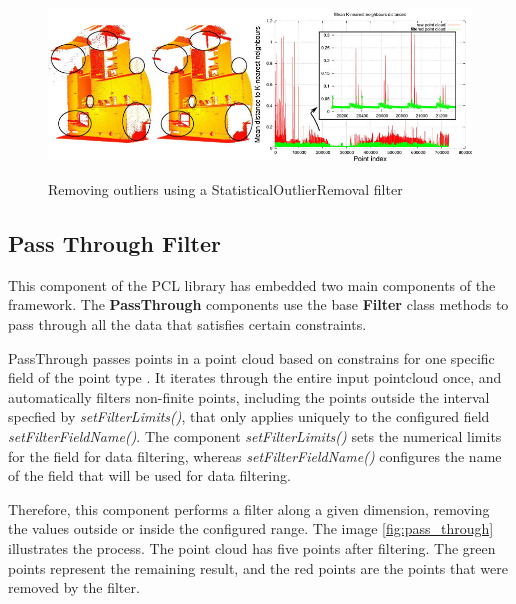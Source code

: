 \documentclass[12pt]{report}
\begin{document}
\begin{figure}[H]%
  \centering
  \includegraphics[width=1\textwidth]{statistical_removal_2.jpg}
 \caption{Removing outliers using a StatisticalOutlierRemoval filter}\cite[]{Rusu_ICRA2011_PCL}
 \label{fig:statistical_removal_2} 
\end{figure}




\subsection{Pass Through Filter}
\label{section:Pass Through Filter}
This component of the PCL library has embedded two main components of the framework. 
The \textbf{PassThrough} components use the base \textbf{Filter} class methods to pass through all the data that satisfies certain constraints.

PassThrough passes points in a point cloud based on constrains for one specific field of the point type .
It iterates through the entire input pointcloud once, and automatically filters non-finite points, including the points outside the interval specfied by \textit{setFilterLimits()}, 
that only applies uniquely to the configured field \textit{setFilterFieldName()}. 
The component \textit{setFilterLimits()} sets the numerical limits for the field for data filtering, whereas \textit{setFilterFieldName()} configures the name of the field that will be used for data filtering.

Therefore, this component performs a filter along a given dimension, removing the values outside or inside the configured range.
The image \ref{fig:pass_through} illustrates the process. The point cloud has five points after filtering. The green points represent the remaining result, and the red points are the points that were removed by the filter.
\end{document}
